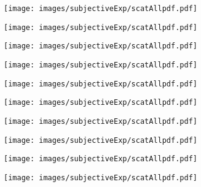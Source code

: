 \documentclass[11pt,a4j,dvipdfmx]{jreport}
\begin{document}
\clearpage


\begin{figure}[H]
  \centering
  \texttt{[image: images/subjectiveExp/scatAllpdf.pdf]}
\end{figure}

\begin{figure}[H]
  \begin{minipage}[b]{0.5\linewidth}
    \centering
    \texttt{[image: images/subjectiveExp/scatAllpdf.pdf]}
  \end{minipage}%
  \begin{minipage}[b]{0.5\linewidth}
    \centering
    \texttt{[image: images/subjectiveExp/scatAllpdf.pdf]}
  \end{minipage}

  \begin{minipage}[b]{0.5\linewidth}
    \centering
    \texttt{[image: images/subjectiveExp/scatAllpdf.pdf]}
  \end{minipage}%
  \begin{minipage}[b]{0.5\linewidth}
    \centering
    \texttt{[image: images/subjectiveExp/scatAllpdf.pdf]}
  \end{minipage}
\end{figure}

\clearpage


\begin{figure}[H]
  \centering
  \texttt{[image: images/subjectiveExp/scatAllpdf.pdf]}
\end{figure}

\begin{figure}[H]
  \begin{minipage}[b]{0.5\linewidth}
    \centering
    \texttt{[image: images/subjectiveExp/scatAllpdf.pdf]}
  \end{minipage}%
  \begin{minipage}[b]{0.5\linewidth}
    \centering
    \texttt{[image: images/subjectiveExp/scatAllpdf.pdf]}
  \end{minipage}

  \begin{minipage}[b]{0.5\linewidth}
    \centering
    \texttt{[image: images/subjectiveExp/scatAllpdf.pdf]}
  \end{minipage}%
  \begin{minipage}[b]{0.5\linewidth}
    \centering
    \texttt{[image: images/subjectiveExp/scatAllpdf.pdf]}
  \end{minipage}
\end{figure}
\end{document}
